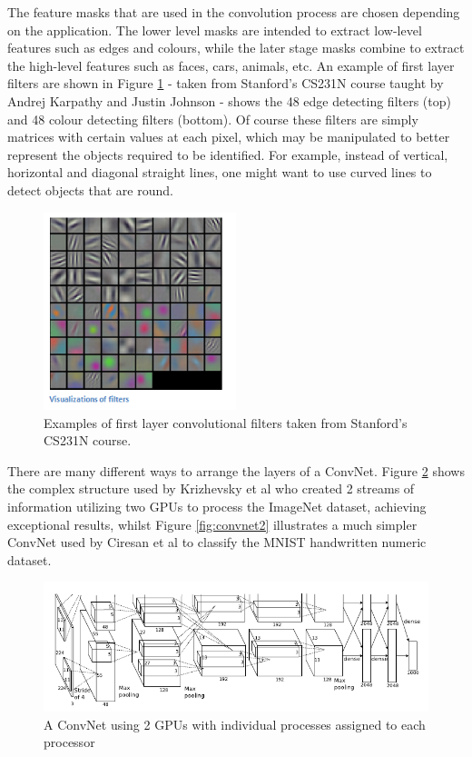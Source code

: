 \documentclass[fleqn,twoside,12pt]{report}
\begin{document}
The feature masks that are used in the convolution process are chosen depending on the application. The lower level masks are intended to extract low-level features such as edges and colours, while the later stage masks combine to extract the high-level features such as faces, cars, animals, etc. An example of first layer filters are shown in Figure \ref{fig:conv_filters} - taken from Stanford's CS231N course taught by Andrej Karpathy and Justin Johnson \cite{andrej} - shows the 48 edge detecting filters (top) and 48 colour detecting filters (bottom). Of course these filters are simply matrices with certain values at each pixel, which may be manipulated to better represent the objects required to be identified. For example, instead of vertical, horizontal and diagonal straight lines, one might want to use curved lines to detect objects that are round.


\begin{figure}
	\begin{center}
		\includegraphics[width=0.5\textwidth]{conv_filters.png}
	\end{center}
	\caption{Examples of first layer convolutional filters taken from Stanford's CS231N course.}
	\label{fig:conv_filters}
\end{figure} 


There are many different ways to arrange the layers of a ConvNet. Figure \ref{fig:convnet1} shows the complex structure used by Krizhevsky et al \cite{krizhevsky} who created 2 streams of information utilizing two GPUs to process the ImageNet dataset, achieving exceptional results, whilst Figure \ref{fig:convnet2} illustrates a much simpler ConvNet used by Ciresan et al \cite{ciresan} to classify the MNIST handwritten numeric dataset. 


\begin{figure}[h]
	\centering
	\includegraphics[width=0.9\linewidth]{convnet1.png}
	\caption{A ConvNet using 2 GPUs with individual processes assigned to each processor}
	\label{fig:convnet1}
\end{figure}%
\end{document}
